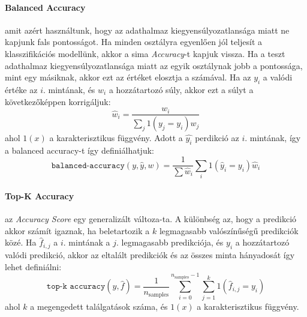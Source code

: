 \documentclass[12pt,a4paper]{article}
\begin{document}
\paragraph{Balanced Accuracy}
amit azért használtunk, hogy az adathalmaz kiegyensúlyozatlansága miatt ne kapjunk fals pontosságot. Ha minden osztályra egyenlően jól teljesít a klasszifikációs modellünk, akkor a sima \emph{Accuracy}-t kapjuk vissza.
Ha a teszt adathalmaz kiegyensúlyozatlansága miatt az egyik osztálynak jobb a pontossága, mint egy másiknak, akkor ezt az értéket elosztja a számával. Ha az \begin{math}y_i\end{math} a valódi értéke az \begin{math}i\end{math}. mintának, és \begin{math}w_i\end{math} a hozzátartozó súly, akkor ezt a súlyt a következőképpen korrigáljuk:
\begin{equation}
    \hat{w}_i = \frac{w_i}{\sum_j{1(y_j = y_i) w_j}}
\end{equation}
ahol \begin{math}1(x)\end{math} a karakterisztikus függvény. Adott a \begin{math}\hat{y_i}\end{math} perdikció az \begin{math}i\end{math}.
mintának, így a balanced accuracy-t így definiálhatjuk:
\begin{equation}
    \texttt{balanced-accuracy}(y, \hat{y}, w) = \frac{1}{\sum{\hat{w}_i}} \sum_i 1(\hat{y}_i = y_i) \hat{w}_i
\end{equation}
\paragraph{Top-K Accuracy}
az \emph{Accuracy Score} egy generalizált változa-ta. A különbség az, hogy a predikció akkor számít igaznak, ha beletartozik a \begin{math}k\end{math}
legmagasabb valószínűségű predikciók közé. Ha \begin{math}\hat{f}_{i,j}\end{math} a \begin{math}i\end{math}. mintának a \begin{math}j\end{math}. legmagasabb
predikciója, és \begin{math}y_i\end{math} a hozzátartozó valódi predikció, akkor az eltalált predikciók és az összes minta hányadosát így
lehet definiálni:
\begin{equation}
    \texttt{top-k accuracy}(y, \hat{f}) = \frac{1}{n_\text{samples}} \sum_{i=0}^{n_\text{samples}-1} \sum_{j=1}^{k} 1(\hat{f}_{i,j} = y_i)
\end{equation}
ahol \begin{math}k\end{math} a megengedett találgatások száma, és \begin{math}1(x)\end{math} a karakterisztikus függvény.
\end{document}
